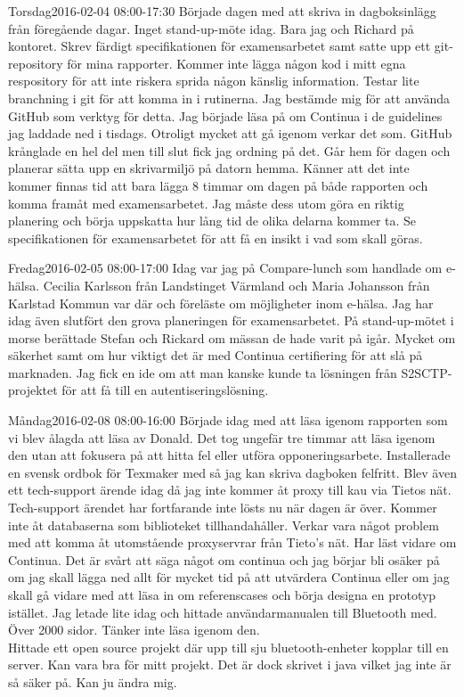 \documentclass[a4paper,oneside]{book}
\begin{document}
\begin{diary}{Torsdag}{2016-02-04 08:00-17:30}
	Började dagen med att skriva in dagboksinlägg från föregående dagar. Inget stand-up-möte idag. Bara jag och Richard på kontoret. Skrev färdigt specifikationen för examensarbetet samt satte upp ett git-repository för mina rapporter. Kommer inte lägga någon kod i mitt egna respository för att inte riskera sprida någon känslig information. Testar lite branchning i git för att komma in i rutinerna. Jag bestämde mig för att använda GitHub som verktyg för detta. Jag började läsa på om Continua i de guidelines jag laddade ned i tisdags. Otroligt mycket att gå igenom verkar det som. GitHub krånglade en hel del men till slut fick jag ordning på det. Går hem för dagen och planerar sätta upp en skrivarmiljö på datorn hemma. Känner att det inte kommer finnas tid att bara lägga 8 timmar om dagen på både rapporten och komma framåt med examensarbetet. Jag måste dess utom göra en riktig planering och börja uppskatta hur lång tid de olika delarna kommer ta. Se specifikationen för examensarbetet för att få en insikt i vad som skall göras.
\end{diary}

\begin{diary}{Fredag}{2016-02-05 08:00-17:00}
	Idag var jag på Compare-lunch som handlade om e-hälsa. Cecilia Karlsson från Landstinget Värmland och Maria Johansson från Karlstad Kommun var där och föreläste om möjligheter inom e-hälsa. Jag har idag även slutfört den grova planeringen för examensarbetet. På stand-up-mötet i morse berättade Stefan och Rickard om mässan de hade varit på igår. Mycket om säkerhet samt om hur viktigt det är med Continua certifiering för att slå på marknaden. Jag fick en ide om att man kanske kunde ta lösningen från S2SCTP-projektet för att få till en autentiseringslösning.
\end{diary}
\newpage

\begin{diary}{Måndag}{2016-02-08 08:00-16:00}
	Började idag med att läsa igenom rapporten som vi blev ålagda att läsa av Donald. Det tog ungefär tre timmar att läsa igenom den utan att fokusera på att hitta fel eller utföra opponeringsarbete. Installerade en svensk ordbok för Texmaker med så jag kan skriva dagboken felfritt. Blev även ett tech-support ärende idag då jag inte kommer åt proxy till kau via Tietos nät.\\
	Tech-support ärendet har fortfarande inte lösts nu när dagen är över. Kommer inte åt databaserna som biblioteket tillhandahåller. Verkar vara något problem med att komma åt utomstående proxyservrar från Tieto's nät. Har läst vidare om Continua. Det är svårt att säga något om continua och jag börjar bli osäker på om jag skall lägga ned allt för mycket tid på att utvärdera Continua eller om jag skall gå vidare med att läsa in om referenscases och börja designa en prototyp istället. Jag letade lite idag och hittade användarmanualen till Bluetooth med. Över 2000 sidor. Tänker inte läsa igenom den.\\
	Hittade ett open source projekt där upp till sju bluetooth-enheter kopplar till en server. Kan vara bra för mitt projekt. Det är dock skrivet i java vilket jag inte är så säker på. Kan ju ändra mig.
\end{diary}
\end{document}
